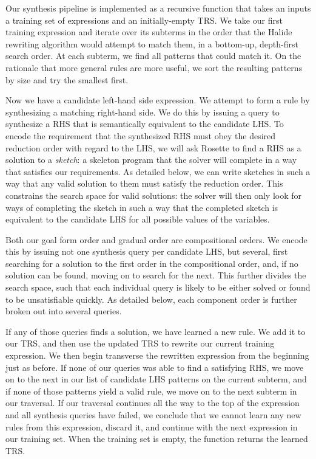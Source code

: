 Our synthesis pipeline is implemented as a recursive function that takes an inputs a training set of expressions and an initially-empty TRS. We take our first training expression and iterate over its subterms in the order that the Halide rewriting algorithm would attempt to match them, in a bottom-up, depth-first search order. At each subterm, we find all patterns that could match it. On the rationale that more general rules are more useful, we sort the resulting patterns by size and try the smallest first. 

Now we have a candidate left-hand side expression. We attempt to form a rule by synthesizing a matching right-hand side. We do this by issuing a query to synthesize a RHS that is semantically equivalent to the candidate LHS. To encode the requirement that the synthesized RHS must obey the desired reduction order with regard to the LHS, we will ask Rosette to find a RHS as a solution to a \emph{sketch}: a skeleton program that the solver will complete in a way that satisfies our requirements. As detailed below, we can write sketches in such a way that any valid solution to them must satisfy the reduction order. This constrains the search space for valid solutions: the solver will then only look for ways of completing the sketch in such a way that the completed sketch is equivalent to the candidate LHS for all possible values of the variables.

Both our goal form order and gradual order are compositional orders. We encode this by issuing not one synthesis query per candidate LHS, but several, first searching for a solution to the first order in the compositional order, and, if no solution can be found, moving on to search for the next. This further divides the search space, such that each individual query is likely to be either solved or found to be unsatisfiable quickly. As detailed below, each component order is further broken out into several queries.

If any of those queries finds a solution, we have learned a new rule. We add it to our TRS, and then use the updated TRS to rewrite our current training expression. We then begin transverse the rewritten expression from the beginning just as before. If none of our queries was able to find a satisfying RHS, we move on to the next in our list of candidate LHS patterns on the current subterm, and if none of those patterns yield a valid rule, we move on to the next subterm in our traversal. If our traversal continues all the way to the top of the expression and all synthesis queries have failed, we conclude that we cannot learn any new rules from this expression, discard it, and continue with the next expression in our training set. When the training set is empty, the function returns the learned TRS.

